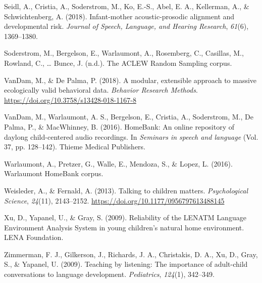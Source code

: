 \documentclass[english,table,man,floatsintext]{apa6}
\begin{document}
\leavevmode\hypertarget{ref-Seidl2018}{}%
Seidl, A., Cristia, A., Soderstrom, M., Ko, E.-S., Abel, E. A., Kellerman, A., \& Schwichtenberg, A. (2018). Infant-mother acoustic-prosodic alignment and developmental risk. \emph{Journal of Speech, Language, and Hearing Research}, \emph{61}(6), 1369--1380.

\leavevmode\hypertarget{ref-soderstrom}{}%
Soderstrom, M., Bergelson, E., Warlaumont, A., Rosemberg, C., Casillas, M., Rowland, C., \ldots{} Bunce, J. (n.d.). The ACLEW Random Sampling corpus.

\leavevmode\hypertarget{ref-VanDam2018}{}%
VanDam, M., \& De Palma, P. (2018). A modular, extensible approach to massive ecologically valid behavioral data. \emph{Behavior Research Methods}. \url{https://doi.org/10.3758/s13428-018-1167-8}

\leavevmode\hypertarget{ref-vandam2016homebank}{}%
VanDam, M., Warlaumont, A. S., Bergelson, E., Cristia, A., Soderstrom, M., De Palma, P., \& MacWhinney, B. (2016). HomeBank: An online repository of daylong child-centered audio recordings. In \emph{Seminars in speech and language} (Vol. 37, pp. 128--142). Thieme Medical Publishers.

\leavevmode\hypertarget{ref-warlaumont2016warlaumont}{}%
Warlaumont, A., Pretzer, G., Walle, E., Mendoza, S., \& Lopez, L. (2016). Warlaumont HomeBank corpus.

\leavevmode\hypertarget{ref-Weisleder2013a}{}%
Weisleder, A., \& Fernald, A. (2013). Talking to children matters. \emph{Psychological Science}, \emph{24}(11), 2143--2152. \url{https://doi.org/10.1177/0956797613488145}

\leavevmode\hypertarget{ref-Xu2009a}{}%
Xu, D., Yapanel, U., \& Gray, S. (2009). Reliability of the LENATM Language Environment Analysis System in young children's natural home environment. LENA Foundation.

\leavevmode\hypertarget{ref-zimmerman2009}{}%
Zimmerman, F. J., Gilkerson, J., Richards, J. A., Christakis, D. A., Xu, D., Gray, S., \& Yapanel, U. (2009). Teaching by listening: The importance of adult-child conversations to language development. \emph{Pediatrics}, \emph{124}(1), 342--349.
\end{document}
